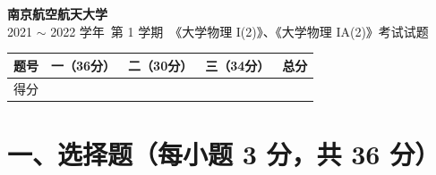 \documentclass[zihao=5,a4paper,UTF8]{ctexart}
\begin{document}
\begin{center}
    {\Large\bfseries 南京航空航天大学}\\[4pt]
    {\large 2021 $\sim$ 2022 学年\ 第 1 学期\ 《大学物理 I(2)》、《大学物理 IA(2)》考试试题}
\end{center}

\begin{center}
\begin{tabular}{|c|c|c|c|c|}
\hline
题号 & 一（36分） & 二（30分） & 三（34分） & 总分 \\
\hline
得分 & \hspace{2.2cm} & \hspace{2.2cm} & \hspace{2.2cm} & \hspace{2.2cm} \\
\hline
\end{tabular}
\end{center}

\section*{一、选择题（每小题 3 分，共 36 分）}
\end{document}
